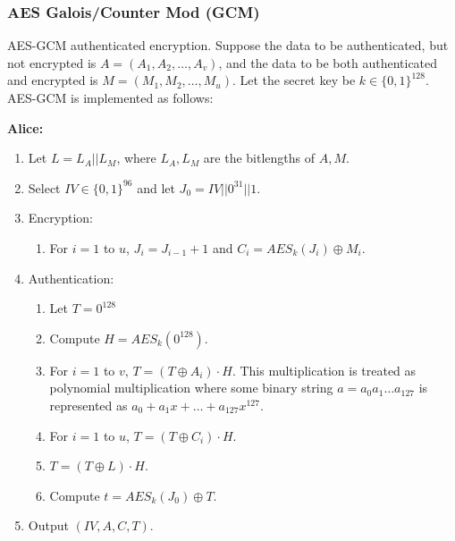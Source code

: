 \documentclass[12pt,titlepage]{article}
\begin{document}
      \subsubsection{AES Galois/Counter Mod (GCM)}
        AES-GCM authenticated encryption. Suppose the data to be authenticated, but not encrypted is $A = (A_1, A_2, \dots, A_v)$, and the data to be both authenticated and encrypted
        is $M = (M_1, M_2, \dots, M_u)$. Let the secret key be $k \in \{0, 1\}^{128}$. AES-GCM is implemented as follows:

        \textbf{Alice:}
        \begin{enumerate}
          \item Let $L = L_A || L_M$, where $L_A, L_M$ are the bitlengths of $A, M$.
          \item Select $IV \in \{0, 1\}^{96}$ and let $J_0 = IV || 0^{31} || 1$.
          \item Encryption:
            \begin{enumerate}
              \item For $i = 1$ to $u$, $J_{i} = J_{i-1} + 1$ and $C_i = AES_{k}(J_i) \oplus M_i$.
            \end{enumerate}
          \item Authentication:
            \begin{enumerate}
              \item Let $T = 0^{128}$
              \item Compute $H = AES_k(0^{128})$.
              \item For $i = 1$ to $v$, $T = (T \oplus A_i) \cdot H$. This multiplication is treated as polynomial multiplication where some binary string
                $a = a_0 a_1 \dots a_{127}$ is represented as $a_0 + a_1 x + \dots + a_{127} x^{127}$.
              \item For $i = 1$ to $u$, $T = (T \oplus C_i) \cdot H$.
              \item $T = (T \oplus L) \cdot H$.
              \item Compute $t = AES_k(J_0) \oplus T$.
            \end{enumerate}
          \item Output $(IV, A, C, T)$.
        \end{enumerate}
\end{document}
